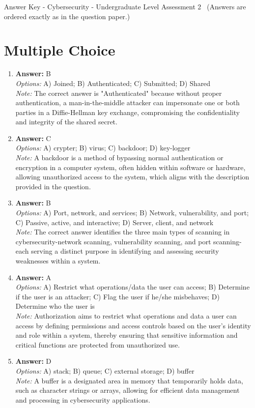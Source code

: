 \documentclass[12pt]{article}
\begin{document}
\begin{center}
Answer Key - Cybersecurity - Undergraduate Level Assessment 2 \
\small (Answers are ordered exactly as in the question paper.)
\end{center}

\section*{Multiple Choice}
\begin{enumerate}[label=\arabic*.]
\item \textbf{Answer:} B
\\ \textit{Options:} A) Joined; B) Authenticated; C) Submitted; D) Shared
\\ \textit{Note:} The correct answer is "Authenticated" because without proper authentication, a man-in-the-middle attacker can impersonate one or both parties in a Diffie-Hellman key exchange, compromising the confidentiality and integrity of the shared secret.
\item \textbf{Answer:} C
\\ \textit{Options:} A) crypter; B) virus; C) backdoor; D) key-logger
\\ \textit{Note:} A backdoor is a method of bypassing normal authentication or encryption in a computer system, often hidden within software or hardware, allowing unauthorized access to the system, which aligns with the description provided in the question.
\item \textbf{Answer:} B
\\ \textit{Options:} A) Port, network, and services; B) Network, vulnerability, and port; C) Passive, active, and interactive; D) Server, client, and network
\\ \textit{Note:} The correct answer identifies the three main types of scanning in cybersecurity-network scanning, vulnerability scanning, and port scanning-each serving a distinct purpose in identifying and assessing security weaknesses within a system.
\item \textbf{Answer:} A
\\ \textit{Options:} A) Restrict what operations/data the user can access; B) Determine if the user is an attacker; C) Flag the user if he/she misbehaves; D) Determine who the user is
\\ \textit{Note:} Authorization aims to restrict what operations and data a user can access by defining permissions and access controls based on the user's identity and role within a system, thereby ensuring that sensitive information and critical functions are protected from unauthorized use.
\item \textbf{Answer:} D
\\ \textit{Options:} A) stack; B) queue; C) external storage; D) buffer
\\ \textit{Note:} A buffer is a designated area in memory that temporarily holds data, such as character strings or arrays, allowing for efficient data management and processing in cybersecurity applications.
\end{enumerate}
\end{document}

